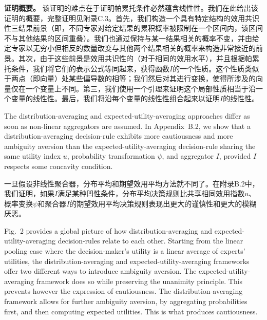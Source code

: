 \documentclass[12pt,a4paper]{article}
\newenvironment{original}
  {\par\noindent\ignorespaces}
  {\par}
\newenvironment{translation}
  {\par\noindent{\color{transblue}\ignorespaces}}
  {\par\medskip}
\begin{document}
\begin{translation}
\textbf{证明概要。} 该证明的难点在于证明帕累托条件必然蕴含线性性。我们在此给出该证明的概要，完整证明见附录C.3。首先，我们构造一个具有特定结构的效用共识性三结果前景（即，不同专家对给定结果的累积概率被限制在一个区间内，该区间不与其他结果的区间重叠）。我们也通过保持与某一结果相关的概率不变，并由给定专家以无穷小但相反的数量改变与其他两个结果相关的概率来构造非常接近的前景。其次，由于这些前景是效用共识性的（对于相同的效用水平），并且根据帕累托条件，我们将它们的表示公式等同起来，获得函数$I$的一个性质。这个性质类似于两点（即向量）处某些偏导数的相等；我们然后对其进行变换，使得所涉及的向量仅在一个变量上不同。第三，我们使用一个引理来证明这个局部性质相当于沿一个变量的线性性。最后，我们将沿每个变量的线性性组合起来以证明$I$的线性性。
\end{translation}

\begin{original}
The distribution-averaging and expected-utility-averaging approaches differ as soon as non-linear aggregators are assumed. In Appendix~B.2, we show that a distribution-averaging decision-rule exhibits more cautiousness and more ambiguity aversion than the expected-utility-averaging decision-rule sharing the same utility index $u$, probability transformation $\psi$, and aggregator $I$, provided $I$ respects some concavity condition.
\end{original}

\begin{translation}
一旦假设非线性聚合器，分布平均和期望效用平均方法就不同了。在附录B.2中，我们证明，如果$I$满足某种凹性条件，分布平均决策规则比共享相同效用指数$u$、概率变换$\psi$和聚合器$I$的期望效用平均决策规则表现出更大的谨慎性和更大的模糊厌恶。
\end{translation}

\begin{original}
Fig.\ 2 provides a global picture of how distribution-averaging and expected-utility-averaging decision-rules relate to each other. Starting from the linear pooling case where the decision-maker's utility is a linear average of experts' utilities, the distribution-averaging and expected-utility-averaging frameworks offer two different ways to introduce ambiguity aversion. The expected-utility-averaging framework does so while preserving the unanimity principle. This prevents however the expression of cautiousness. The distribution-averaging framework allows for further ambiguity aversion, by aggregating probabilities first, and then computing expected utilities. This is what produces cautiousness.
\end{original}
\end{document}

